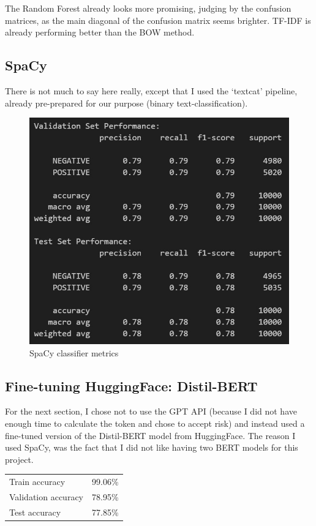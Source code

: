 \documentclass[12pt]{article}
\begin{document}
The Random Forest already looks more promising, judging by the confusion matrices, 
as the main diagonal of the confusion matrix seems brighter. TF-IDF
is already performing better than the BOW method.

\pagebreak

\subsection{SpaCy}
There is not much to say here really, except that I used the `textcat'
pipeline, already pre-prepared for our purpose (binary text-classification).

\begin{figure}[h!]
    \centering
    \includegraphics[width=.6\textwidth]{P2.SpaCy.jpg}
    \caption{SpaCy classifier metrics}
    \label{fig:P2.SpaCy}
\end{figure}

\pagebreak

\subsection{Fine-tuning HuggingFace: Distil-BERT}

For the next section, I chose not to use the GPT API (because I did not
have enough time to calculate the token and chose to accept risk)
and instead used a fine-tuned version of the Distil-BERT model from 
HuggingFace. The reason I used SpaCy, was the fact that I did not like
having two BERT models for this project.

\begin{tabular}{lr}
    Train accuracy & 99.06\%\\
    Validation accuracy & 78.95\%\\
    Test accuracy & 77.85\%\\
\end{tabular}
\end{document}
